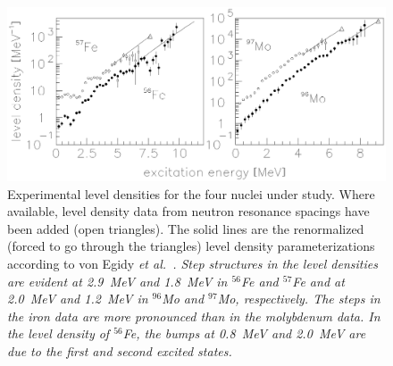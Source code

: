 \begin{figure}\centering
\includegraphics[totalheight=8.9cm]{fig4.eps}
\caption{Experimental level densities for the four nuclei under study. Where
available, level density data from neutron resonance spacings have been added 
(open triangles). The solid lines are the renormalized (forced to go through 
the triangles) level density parameterizations according to von Egidy \sl et 
al.\ \rm \protect\cite{ES88}. Step structures in the level densities are evident at 
2.9~MeV and 1.8~MeV in $^{56}$Fe and $^{57}$Fe and at 2.0~MeV and 1.2~MeV in 
$^{96}$Mo and $^{97}$Mo, respectively. The steps in the iron data are more
pronounced than in the molybdenum data. In the level density of $^{56}$Fe, the 
bumps at 0.8~MeV and 2.0~MeV are due to the first and second excited states.}
\label{fig:levdens}
\end{figure}

\clearpage

